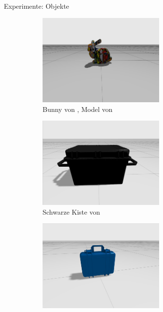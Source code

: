 \documentclass[aspectratio=169]{beamer}
\begin{document}
\begin{frame}{Experimente: Objekte}

	\begin{figure}[h]
		\centering
		\begin{subfigure}{0.35\textwidth}
			\centering
			\includegraphics[width=0.7\textwidth]{Graphics/bunny.png}
			\caption{Bunny von \cite{noauthor_stanford_nodate}, Model von \cite{delmerico_comparison_2018}}
		\end{subfigure}
		\begin{subfigure}{0.35\textwidth}
			\centering
			\includegraphics[width=0.7\textwidth]{Graphics/crate}
			\caption{Schwarze Kiste von \cite{GazeboFuel-OpenRobotics-Large-Crate}}
		\end{subfigure}
		\vspace{0.5cm}
		\begin{subfigure}{0.35\textwidth}
			\centering
			\includegraphics[width=0.7\textwidth]{Graphics/box}

\end{subfigure}
\end{figure}
\end{frame}
\end{document}
